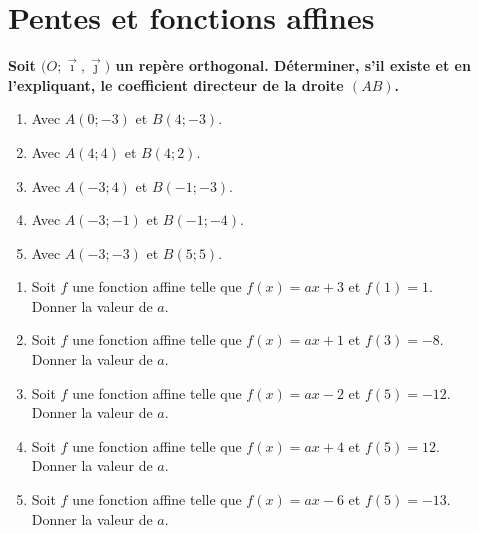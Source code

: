 \documentclass[11pt]{article}
\begin{document}
\phantom{0}
\vspace{-1.5cm}
\section{Pentes et fonctions affines}

\begin{multicols}{2}
\begin{exercice}
\textbf{Soit $\big(O ; \vec \imath,\vec \jmath\big)$ un repère orthogonal.  Déterminer, s'il existe et en l'expliquant, le coefficient directeur de la droite $(AB)$.}
\begin{enumerate}[itemsep=1em]
	\item \begin{minipage}[t]{\linewidth} Avec $A(0;-3)$ et $B(4;-3)$.  \end{minipage}
	\item \begin{minipage}[t]{\linewidth} Avec $A(4;4)$ et $B(4;2)$.  \end{minipage}
	\item \begin{minipage}[t]{\linewidth} Avec $A(-3;4)$ et $B(-1;-3)$.  \end{minipage}
	\item \begin{minipage}[t]{\linewidth} Avec $A(-3;-1)$ et $B(-1;-4)$.  \end{minipage}
	\item \begin{minipage}[t]{\linewidth} Avec $A(-3;-3)$ et $B(5;5)$.  \end{minipage}
\end{enumerate}
\end{exercice}

\begin{exercice}
\begin{enumerate}[itemsep=1em]
	\item Soit $f$ une fonction affine telle que $f(x)=ax+3$ et $f(1)=1$.\\    Donner la valeur de $a$.
    
	\item Soit $f$ une fonction affine telle que $f(x)=ax+1$ et $f(3)=-8$.\\    Donner la valeur de $a$.
    
	\item Soit $f$ une fonction affine telle que $f(x)=ax-2$ et $f(5)=-12$.\\      Donner la valeur de $a$.
    
	\item Soit $f$ une fonction affine telle que $f(x)=ax+4$ et $f(5)=12$.\\    Donner la valeur de $a$.
    
	\item Soit $f$ une fonction affine telle que $f(x)=ax-6$ et $f(5)=-13$.\\    Donner la valeur de $a$.
\end{enumerate}
\end{exercice}
\end{multicols}
\end{document}
